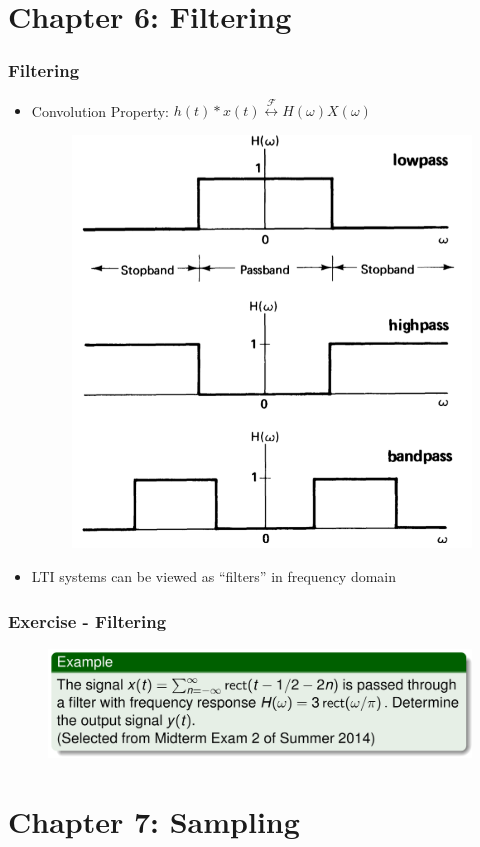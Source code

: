 \documentclass{beamer}
\begin{document}
\section{Chapter 6: Filtering}
\begin{frame}
\frametitle{Filtering}
\begin{itemize}
\item Convolution Property: $h(t)* x(t) \stackrel{\mathscr{F}}{\longleftrightarrow} H(\omega) X(\omega)    $

\begin{figure}
\includegraphics[width=0.5\linewidth]{filter}
\end{figure}
\item LTI systems can be viewed as ``filters'' in frequency domain
\end{itemize}
\end{frame}

\begin{frame}[t]
    \frametitle{Exercise - Filtering}
    \begin{figure}
        \includegraphics[width=0.8\linewidth]{ex_filter}
    \end{figure}
\end{frame}


\section{Chapter 7: Sampling}
\end{document}
